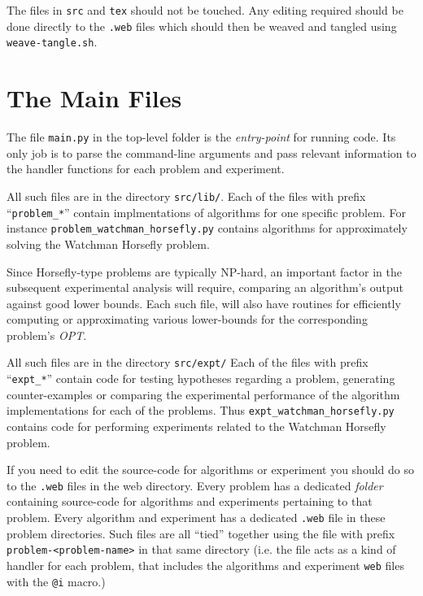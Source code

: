 \documentclass[11.5pt]{report}
\begin{document}
The files in \texttt{src} and \texttt{tex} should not be touched. Any editing required should 
be done directly to the \texttt{.web} files which should then be weaved and tangled 
using \texttt{weave-tangle.sh}. 

\section{The Main Files} 

\newchunk 
\begin{alphalist}

\item {} The file \verb|main.py| in the top-level folder is the 
\textit{entry-point} for running code. Its only job is to parse the 
command-line arguments and pass relevant information to the handler 
functions for each problem and experiment. 

\item {} All such files are in the directory \texttt{src/lib/}.
  Each of the files with prefix ``\verb|problem_*|'' contain implmentations of 
  algorithms for one specific problem. For instance \verb|problem_watchman_horsefly.py| 
  contains algorithms for approximately solving the Watchman Horsefly problem. 
 
  Since Horsefly-type problems are typically NP-hard, an important factor in 
  the subsequent experimental analysis will require, comparing an algorithm's  
  output against good lower bounds. Each such file, will also have routines
  for efficiently computing or approximating various lower-bounds for the 
  corresponding problem's \textit{OPT}. 

\item {} All such files are in the directory \texttt{src/expt/}
 Each of the files with prefix ``\verb|expt_*|'' 
 contain code for testing hypotheses regarding a problem, generating 
 counter-examples or comparing the experimental performance of the 
 algorithm implementations for each of the problems. Thus 
 \verb|expt_watchman_horsefly.py| contains 
 code for performing experiments related to the 
 Watchman Horsefly problem. 
\end{alphalist}


If you need to edit the source-code for algorithms or experiment 
you should do so to the \texttt{.web} files in the web directory. Every problem
has a dedicated \textit{folder} containing source-code for algorithms and experiments 
pertaining to that problem. Every algorithm and experiment has a dedicated \verb|.web|
file in these problem directories. Such files are all ``tied'' together using the 
file with prefix \verb|problem-<problem-name>| in that same directory (i.e.
the file acts as a kind of handler for each problem, that includes the algorithms
and experiment \verb|web| files with the \verb|@i| macro.) 
\end{document}
